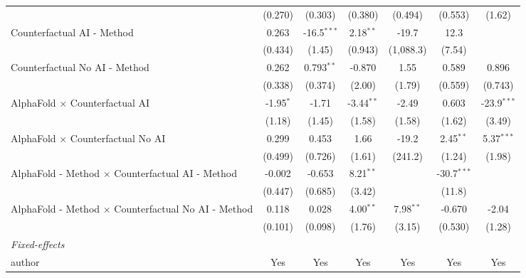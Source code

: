 \begin{tabular}{lcccccc}
                                                              & (0.270)      & (0.303)       & (0.380)      & (0.494)     & (0.553)       & (1.62)\\   
   Counterfactual AI - Method                                 & 0.263        & -16.5$^{***}$ & 2.18$^{**}$  & -19.7       & 12.3          &   \\   
                                                              & (0.434)      & (1.45)        & (0.943)      & (1,088.3)   & (7.54)        &   \\   
   Counterfactual No AI - Method                              & 0.262        & 0.793$^{**}$  & -0.870       & 1.55        & 0.589         & 0.896\\   
                                                              & (0.338)      & (0.374)       & (2.00)       & (1.79)      & (0.559)       & (0.743)\\   
   AlphaFold $\times$ Counterfactual AI                       & -1.95$^{*}$  & -1.71         & -3.44$^{**}$ & -2.49       & 0.603         & -23.9$^{***}$\\   
                                                              & (1.18)       & (1.45)        & (1.58)       & (1.58)      & (1.62)        & (3.49)\\   
   AlphaFold $\times$ Counterfactual No AI                    & 0.299        & 0.453         & 1.66         & -19.2       & 2.45$^{**}$   & 5.37$^{***}$\\   
                                                              & (0.499)      & (0.726)       & (1.61)       & (241.2)     & (1.24)        & (1.98)\\   
   AlphaFold - Method $\times$ Counterfactual AI - Method     & -0.002       & -0.653        & 8.21$^{**}$  &             & -30.7$^{***}$ &   \\   
                                                              & (0.447)      & (0.685)       & (3.42)       &             & (11.8)        &   \\   
   AlphaFold - Method $\times$ Counterfactual No AI - Method  & 0.118        & 0.028         & 4.00$^{**}$  & 7.98$^{**}$ & -0.670        & -2.04\\   
                                                              & (0.101)      & (0.098)       & (1.76)       & (3.15)      & (0.530)       & (1.28)\\   
   \midrule
   \emph{Fixed-effects}\\
   author                                                     & Yes          & Yes           & Yes          & Yes         & Yes           & Yes\\  

\end{tabular}

